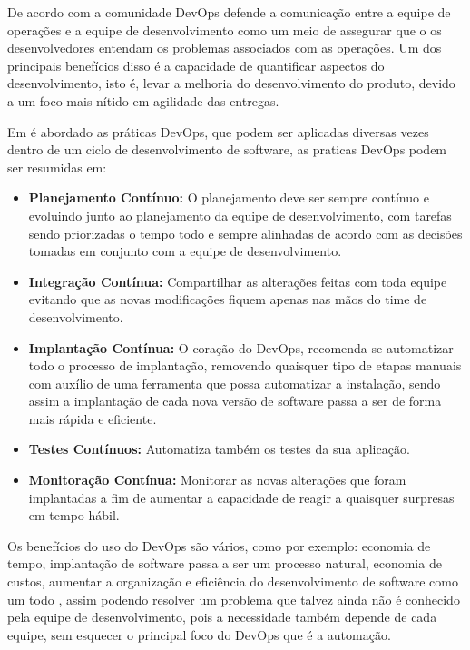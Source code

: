 De acordo com \cite{httermann2012DevOps} a comunidade DevOps defende a comunicação
entre a equipe de operações e a equipe de desenvolvimento como um meio de assegurar
que o os desenvolvedores entendam os problemas associados com as operações. Um dos
principais benefícios disso é a capacidade de quantificar aspectos do desenvolvimento,
isto é, levar a melhoria do desenvolvimento do produto, devido a um foco mais nítido
em agilidade das entregas.

Em \cite{7173368} é abordado as práticas DevOps, que podem ser aplicadas diversas
 vezes dentro de um ciclo de desenvolvimento de software, as praticas DevOps podem ser resumidas em:

 \begin{itemize}
   \item \textbf{Planejamento Contínuo:} O planejamento deve ser sempre contínuo
   e evoluindo junto ao planejamento da equipe de desenvolvimento, com tarefas
   sendo priorizadas o tempo todo e sempre alinhadas de acordo com as decisões tomadas
   em conjunto com a equipe de desenvolvimento.
   \item \textbf{Integração Contínua:} Compartilhar as alterações feitas com toda equipe
   evitando que as novas modificações fiquem apenas nas mãos do time de desenvolvimento.
   \item \textbf{Implantação Contínua:} O coração do DevOps, recomenda-se automatizar
   todo o processo de implantação, removendo quaisquer tipo de etapas manuais com auxílio
   de uma ferramenta que possa automatizar a instalação, sendo assim a implantação
   de cada nova versão de software passa a ser de forma mais rápida e eficiente.
   \item \textbf{Testes Contínuos:} Automatiza também os testes da sua aplicação.
   \item \textbf{Monitoração Contínua:} Monitorar as novas alterações
   que foram implantadas a fim de aumentar a capacidade de reagir a quaisquer surpresas
   em tempo hábil.
 \end{itemize}

 Os benefícios do uso do DevOps são vários, como por exemplo: economia de tempo,
 implantação de software passa a ser um processo natural, economia de custos, aumentar
 a organização e eficiência do desenvolvimento de software como um todo \cite{7173368},
 assim podendo resolver um problema que talvez ainda não é conhecido pela equipe
 de desenvolvimento, pois a necessidade também depende de cada equipe, sem
 esquecer o principal foco do DevOps que é a automação.


